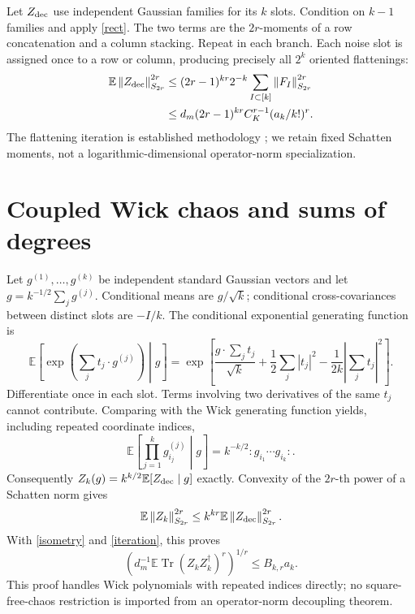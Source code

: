 \documentclass[11pt]{article}
\newcommand{\E}{\mathbb E}
\newcommand{\Tr}{\operatorname{Tr}}
\newcommand{\norm}[1]{\left\lVert#1\right\rVert}
\begin{document}
Let $Z_{\rm dec}$ use independent Gaussian families for its $k$ slots.
Condition on $k-1$ families and apply \eqref{rect}. The two terms
are the $2r$-moments of a row concatenation and a column stacking.
Repeat in each branch. Each noise slot is assigned once to a row or
column, producing precisely all $2^k$ oriented flattenings:
\begin{align}
 \E\norm{Z_{\rm dec}}_{S_{2r}}^{2r}
 &\le(2r-1)^{kr}2^{-k}\sum_{I\subset[k]}
                      \norm{F_I}_{S_{2r}}^{2r}\label{iteration}\\
 &\le d_m(2r-1)^{kr}C_K^{r-1}(a_k/k!)^r .\nonumber
\end{align}
The flattening iteration is established methodology \cite{chaos};
we retain fixed Schatten moments, not a logarithmic-dimensional
operator-norm specialization.

\newpage
\section{Coupled Wick chaos and sums of degrees}
Let $g^{(1)},\ldots,g^{(k)}$ be independent standard Gaussian vectors
and let $g=k^{-1/2}\sum_jg^{(j)}$. Conditional means are $g/\sqrt k$;
conditional cross-covariances between distinct slots are $-I/k$.
The conditional exponential generating function is
\begin{equation}\label{generating}
 \E\left[\exp\left(\sum_j t_j\cdot g^{(j)}\right)\middle|g\right]
 =\exp\left[\frac{g\cdot\sum_jt_j}{\sqrt k}
       +\frac12\sum_j|t_j|^2-\frac1{2k}\left|\sum_jt_j\right|^2\right].
\end{equation}
Differentiate once in each slot. Terms involving two derivatives of
the same $t_j$ cannot contribute. Comparing with the Wick generating
function yields, including repeated coordinate indices,
\begin{equation}\label{conditional}
 \E\left[\prod_{j=1}^k g^{(j)}_{i_j}\middle|g\right]
 =k^{-k/2}:g_{i_1}\cdots g_{i_k}:.
\end{equation}
Consequently $Z_k(g)=k^{k/2}\E[Z_{\rm dec}\mid g]$ exactly. Convexity
of the $2r$-th power of a Schatten norm gives
\begin{equation}
 \E\norm{Z_k}_{S_{2r}}^{2r}
 \le k^{kr}\E\norm{Z_{\rm dec}}_{S_{2r}}^{2r}.
\end{equation}
With \eqref{isometry} and \eqref{iteration}, this proves
\begin{equation}\label{purebound}
 \left(d_m^{-1}\E\Tr (Z_kZ_k^\dagger)^r\right)^{1/r}
 \le B_{k,r}a_k.
\end{equation}
This proof handles Wick polynomials with repeated indices directly;
no square-free-chaos restriction is imported from an operator-norm
decoupling theorem.
\end{document}
